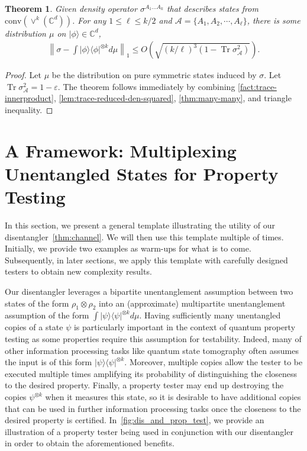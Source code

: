 \documentclass[10pt,a4paper]{article}
\newtheorem{theorem}{Theorem}[section]
\theoremstyle{remark}
\def\epsilon{\varepsilon}
\newcommand{\C}{{\mathbb C}}
\newcommand{\cA}{\mathcal{A}}
\newcommand{\conv}[1]{\mathrm{conv}\inparen{#1}}
\newcommand{\1}[1]{\mathds{1}{[#1]}}
\newcommand{\inparen}[1]{\left(#1\right)}             %
\newcommand{\ket}[1]{\lvert #1\rangle}
\newcommand{\Symm}[2]{\vee^{#1}(\C^{#2})}
\newcommand{\trace}{\operatorname{Tr}}
\newcommand{\bra}[1]{\langle#1|}
\numberwithin{equation}{section}
\begin{document}
\begin{theorem}\label{thm:conv-symm-de-Finetti}
Given density operator $\sigma^{A_1\ldots A_k}$ that describes states from $\conv{\Symm{k}{d}}$. 
For any $1\le \ell\le k/2$ and $\cA=\{A_1,A_2,\cdots, A_\ell\}$, there is some distribution $\mu$ on $\ket\phi\in\C^d$,
\begin{align}
    \left\|
        \sigma - \int \ket\phi\bra\phi^{\otimes k} d\mu
    \right\|_1 \le O\left(\sqrt{(k/\ell)^3(1-\trace{\sigma_{\cA}^2}) }\right).
\end{align}

\end{theorem}
\begin{proof}
Let $\mu$ be the distribution on pure symmetric states induced by $\sigma$. Let $\trace\sigma_{\cA}^2=1-\epsilon$. The theorem follows immediately by combining \cref{fact:trace-innerproduct}, \cref{lem:trace-reduced-den-squared}, \cref{thm:many-many}, and triangle inequality.
\end{proof}



\section{A Framework: Multiplexing Unentangled States for Property Testing}\label{sec:prop_testing}

In this section, we present a general template illustrating the utility of our disentangler~\cref{thm:channel}. 
We will then use this template multiple of times. Initially, we provide two examples as warm-ups for what is to come. Subsequently, in later sections, we apply this template with carefully designed testers to obtain new complexity results.

Our disentangler leverages a bipartite unentanglement assumption between two states of the form
$\rho_1 \otimes \rho_2$ into an (approximate) multipartite unentanglement assumption of the form $\int \ket\psi\bra\psi^{\otimes k}d\mu$.
Having sufficiently many unentangled copies of a state $\psi$ is particularly important in the context of quantum property
testing as some properties require this assumption for testability. Indeed, many of other information processing
tasks like quantum state tomography often assumes the input is of this form $\ket \psi\bra\psi^{\otimes k}$. Moreover, multiple copies
allow the tester to be executed multiple times amplifying its probability of distinguishing the closeness to
the desired property. Finally, a property tester may end up destroying the copies $\psi^{\otimes k}$ when it measures this state,
so it is desirable to have additional copies that can be used in further information processing tasks once the closeness to
the desired property is certified. In~\cref{fig:dis_and_prop_test}, we provide an illustration of a property
tester being used in conjunction with our disentangler in order to obtain the aforementioned benefits.
\end{document}
